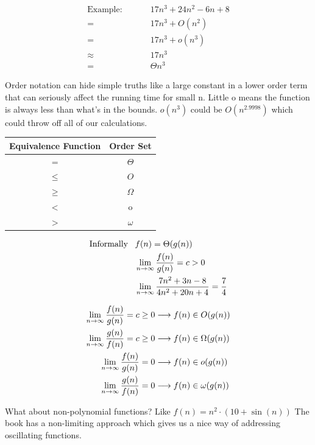 \documentclass[english, 10pt]{article}
\begin{document}
\begin{align*}
    \text{Example:} \;\;\;\;\;\;\;\;\;
    &17n^3 +24n^2 -6n +8 \\ %
    =& 17n^3 + O(n^2) \\
    =& 17n^3 + o(n^3) \\
    \approx& 17n^3 \\
    =& \Theta{n^3}
\end{align*}

Order notation can hide simple truths like a large constant in a lower order
term that can seriously affect the running time for small n.  Little o means
the function is always less than what's in the bounds. $o(n^3)$ could be
$O(n^{2.9998})$ which could throw off all of our calculations.

\begin{center}
\begin{tabular}{cc}
    Equivalence Function & Order Set\\ \toprule
    $=$ & $\Theta$ \\ \midrule
    $\le$ & $O$ \\ \midrule
    $\ge$ & $\Omega$ \\ \midrule
    $<$ & o \\ \midrule
    $>$ & $\omega$ \\
\end{tabular}
\end{center}


\begin{align*}
    \text{Informally}\;\;\; & f(n) = \Theta(g(n))  \\
    & \lim_{n\rightarrow \infty}\frac{f(n)}{g(n)}= c > 0 \\
    & \lim_{n \rightarrow \infty}\frac{7n^2 +3n -8}{4n^2 +20n +4}=\frac{7}{4}
\end{align*}


\begin{align*}
    \lim_{n \rightarrow \infty} \frac{f(n)}{g(n)} = c \ge 0\longrightarrow   f(n) &\in O(g(n))     \\
    \lim_{n \rightarrow \infty} \frac{g(n)}{f(n)} = c \ge 0\longrightarrow   f(n) &\in \Omega(g(n))\\
    \lim_{n \rightarrow \infty} \frac{f(n)}{g(n)} =0       \longrightarrow   f(n) &\in o(g(n))     \\
    \lim_{n \rightarrow \infty} \frac{g(n)}{f(n)} =0       \longrightarrow   f(n) &\in \omega(g(n))\\
\end{align*}

What about non-polynomial functions? Like $f(n) = n^2 \cdot(10+\sin (n))$ The
book has a non-limiting approach which gives us a nice way of addressing
oscillating functions.
\end{document}
